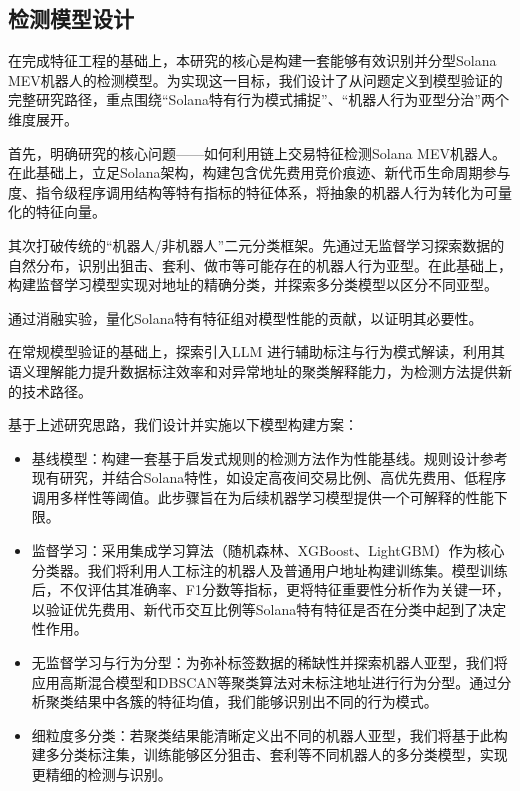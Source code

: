 \subsection{检测模型设计}
\par 在完成特征工程的基础上，本研究的核心是构建一套能够有效识别并分型Solana MEV机器人的检测模型。为实现这一目标，我们设计了从问题定义到模型验证的完整研究路径，重点围绕“Solana特有行为模式捕捉”、“机器人行为亚型分治”两个维度展开。
\par 首先，明确研究的核心问题——如何利用链上交易特征检测Solana MEV机器人。在此基础上，立足Solana架构，构建包含优先费用竞价痕迹、新代币生命周期参与度、指令级程序调用结构等特有指标的特征体系，将抽象的机器人行为转化为可量化的特征向量。
\par 其次打破传统的“机器人/非机器人”二元分类框架。先通过无监督学习探索数据的自然分布，识别出狙击、套利、做市等可能存在的机器人行为亚型。在此基础上，构建监督学习模型实现对地址的精确分类，并探索多分类模型以区分不同亚型。
\par 通过消融实验，量化Solana特有特征组对模型性能的贡献，以证明其必要性。
\par 在常规模型验证的基础上，探索引入LLM 进行辅助标注与行为模式解读，利用其语义理解能力提升数据标注效率和对异常地址的聚类解释能力，为检测方法提供新的技术路径。
\par 基于上述研究思路，我们设计并实施以下模型构建方案：
\begin{itemize}
    \item 基线模型：构建一套基于启发式规则的检测方法作为性能基线。规则设计参考现有研究，并结合Solana特性，如设定高夜间交易比例、高优先费用、低程序调用多样性等阈值。此步骤旨在为后续机器学习模型提供一个可解释的性能下限。
    \item 监督学习：采用集成学习算法（随机森林、XGBoost、LightGBM）作为核心分类器。我们将利用人工标注的机器人及普通用户地址构建训练集。模型训练后，不仅评估其准确率、F1分数等指标，更将特征重要性分析作为关键一环，以验证优先费用、新代币交互比例等Solana特有特征是否在分类中起到了决定性作用。
    \item 无监督学习与行为分型：为弥补标签数据的稀缺性并探索机器人亚型，我们将应用高斯混合模型和DBSCAN等聚类算法对未标注地址进行行为分型。通过分析聚类结果中各簇的特征均值，我们能够识别出不同的行为模式。
    \item 细粒度多分类：若聚类结果能清晰定义出不同的机器人亚型，我们将基于此构建多分类标注集，训练能够区分狙击、套利等不同机器人的多分类模型，实现更精细的检测与识别。
\end{itemize}



